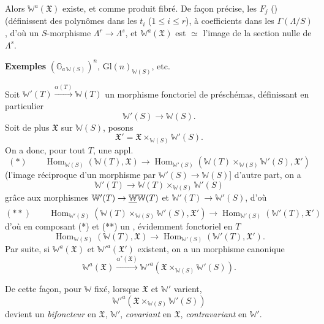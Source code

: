 \documentclass[11pt,a4paper]{article}
\begin{document}
Alors $\mathbb{W}^{a}(\mathfrak{X})$ existe, et \ill{} \ill{} \ill{} comme
produit fibré. De façon précise, les $F_j$ ()
(définissent des polynômes dans les $t_i$ ($1 \le i \le r$), à
coefficients dans les $\Gamma(\Lambda/S)$, d'où \struck{\ill{}} un
$S$-morphisme $\Lambda^{r} \to \Lambda^{s}$, et $\mathbb{W}^{a}(\mathfrak{X})$
est $\simeq$ l'image  de la section
nulle de $\Lambda^{s}$.

\textbf{Exemples} \struck{\ill{}} $(\mathbb{G}_{a\,\mathbb{W}(S)})^{n}$,
$\mathrm{Gl}(n)_{\mathbb{W}(S)}$, etc.

Soit $\mathbb{W}'(T) \xrightarrow{\alpha(T)} \mathbb{W}(T)$ un morphisme
fonctoriel de préschémas, définissant en particulier
\[
  \mathbb{W}'(S) \to \mathbb{W}(S) .
\]
Soit de plus $\mathfrak{X}$ sur $\mathbb{W}(S)$, posons
\[
  \mathfrak{X}' = \mathfrak{X} \times_{\mathbb{W}(S)} \mathbb{W}'(S) .
\]
On a donc, pour tout $T$, une appl.
\add{\struck{\ill{}}}
\[
  (*) \qquad \operatorname{Hom}_{\mathbb{W}(S)}(\mathbb{W}(T), \mathfrak{X})
  \to \operatorname{Hom}_{\mathbb{W}'(S)}(\mathbb{W}(T)
  \times_{\mathbb{W}(S)} \mathbb{W}'(S), \mathfrak{X}')
\]
(l'image réciproque d'un morphisme par $\mathbb{W}'(S) \to \mathbb{W}(S)$]
d'autre part, on a
\[
  \mathbb{W}'(T) \to \mathbb{W}(T) \times_{\mathbb{W}(S)} \mathbb{W}'(S)
\]
 grâce aux morphismes $\mathbb{W}'(T) \to
\struck{\mathbb{W}} \mathbb{W}(T)$ et $\mathbb{W}'(T) \to \mathbb{W}'(S)$,
d'où
\[
  (**) \qquad \operatorname{Hom}_{\mathbb{W}'(S)}(\mathbb{W}(T)
  \times_{\mathbb{W}(S)} \mathbb{W}'(S), \mathfrak{X}') \to
  \operatorname{Hom}_{\mathbb{W}'(S)}(\mathbb{W}'(T), \mathfrak{X}')
\]
d'où en composant (*) et (**) un  \struck{\ill{}},
évidemment fonctoriel en $T$
\[
  \operatorname{Hom}_{\mathbb{W}(S)}(\mathbb{W}(T), \mathfrak{X})
  \longrightarrow
  \operatorname{Hom}_{\mathbb{W}'(S)}(\mathbb{W}'(T), \mathfrak{X}') .
\]
Par suite, si $\mathbb{W}^{a}(\mathfrak{X})$ et
$\mathbb{W}'^{a}(\mathfrak{X}')$ existent, on a un morphisme canonique
\[
  \mathbb{W}^{a}(\mathfrak{X}) \xrightarrow{\alpha^{*}(\mathfrak{X})}
  \mathbb{W}'^{a}(\mathfrak{X} \times_{\mathbb{W}(S)} \mathbb{W}'(S)) .
\]

De cette façon, pour $\mathbb{W}$ fixé, \struck{\ill{}} lorsque
$\mathfrak{X}$ et $\mathbb{W}'$ varient,
\[
  \mathbb{W}'^{a}(\mathfrak{X} \times_{\mathbb{W}(S)} \mathbb{W}'(S))
\]
devient un \emph{bifoncteur} en $\mathfrak{X}$, $\mathbb{W}'$,
\emph{covariant} en $\mathfrak{X}$, \emph{contravariant} en $\mathbb{W}'$.
\end{document}
